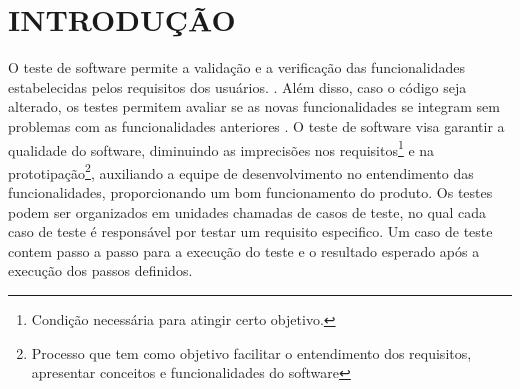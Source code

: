 \chapter{INTRODUÇÃO}
\label{chap:introducao}




O teste de software permite a validação e a verificação das funcionalidades estabelecidas pelos requisitos dos usuários. \cite{PRESMA2016}. Além disso, caso o código seja alterado, os testes permitem avaliar se as novas funcionalidades se integram sem problemas com as funcionalidades anteriores \cite{Hushalini}. O teste de software visa garantir a qualidade do software, diminuindo as imprecisões nos requisitos\footnote{Condição necessária para atingir certo objetivo.} e na prototipação\footnote{ Processo que tem como objetivo facilitar o entendimento dos requisitos, apresentar conceitos e funcionalidades do software}, auxiliando a equipe de desenvolvimento no entendimento das funcionalidades, proporcionando um bom funcionamento do produto. Os testes podem ser organizados em unidades chamadas de casos de teste, no qual cada caso de teste é responsável por testar um requisito especifico. Um caso de teste contem passo a passo para a execução do teste e o resultado esperado após a execução dos passos definidos.

